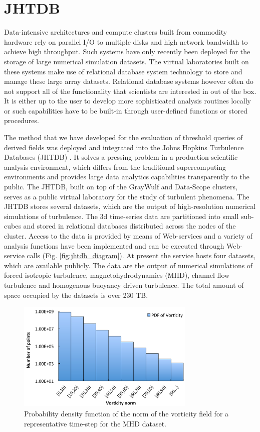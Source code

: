 \documentclass{sig-alternate}
\begin{document}
\section{JHTDB}\label{jhtdb}
Data-intensive architectures and compute clusters built from commodity hardware rely on parallel I/O to multiple disks and high network bandwidth
to achieve high throughput. Such systems have only recently been deployed for the storage of large numerical simulation 
datasets. The virtual laboratories built on these systems make use of relational database system technology to store and manage these large array datasets.
Relational database systems however often do not support
all of the functionality that scientists are interested in out of the box. It is either up to the user to develop more sophisticated analysis routines locally or such
capabilities have to be built-in through user-defined functions or stored procedures. 

The method that we have developed for the evaluation of threshold queries of derived fields was deployed and integrated into the 
Johns Hopkins Turbulence Databases (JHTDB) \cite{Yi, Perlman}. It solves a pressing problem in a production scientific analysis environment, which differs 
from the traditional supercomputing environments and provides large data analytics capabilities transparently to the public. 
The JHTDB, built on top of the GrayWulf and Data-Scope clusters, serves as a public virtual laboratory for
the study of turbulent phenomena. The JHTDB stores several datasets, which are the output of high-resolution numerical simulations of turbulence.
The 3d time-series data are partitioned into small sub-cubes and stored in relational databases distributed across the nodes of the cluster.
Access to the data is provided by means of Web-services and a variety of analysis functions have been
implemented and can be executed through Web-service calls (Fig. \ref{fig:jhtdb_diagram}).
At present the service hosts four datasets, which are available publicly. 
The data are the output of numerical simulations of forced isotropic turbulence, magnetohydrodynamics (MHD), channel 
flow turbulence and homogenous buoyancy driven turbulence.
The total amount of space occupied by the datasets is over 230 TB. 

\begin{figure}
\centering
\includegraphics[width=3.35in]{Figures/pdf.pdf}
\caption{Probability density function of the norm of the vorticity field for a representative time-step for the MHD dataset.}
\label{fig:pdf}
\end{figure}
\end{document}
